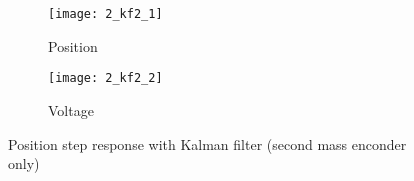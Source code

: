 \begin{figure*}[h]
	\centering
	\begin{subfigure}{0.5\columnwidth}
		\texttt{[image: 2\_kf2\_1]}
		\caption{Position}
	\end{subfigure}
	\begin{subfigure}{0.45\columnwidth}
		\texttt{[image: 2\_kf2\_2]}
		\caption{Voltage}
	\end{subfigure}
	\caption{Position step response with Kalman filter (second mass enconder only)}
\end{figure*}
